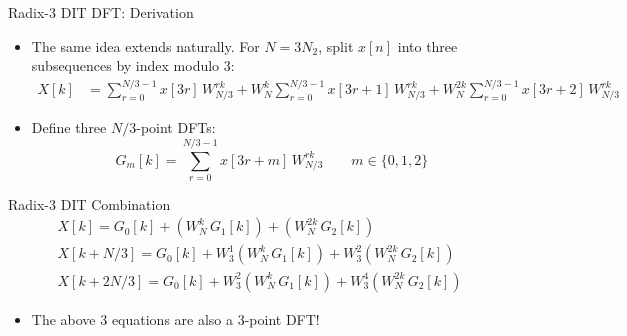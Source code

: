 \begin{frame}{Radix-3 DIT DFT: Derivation}
    \begin{itemize}
        \item The same idea extends naturally. For $N = 3 N_2$, split $x[n]$ into three subsequences by index modulo 3:
              \begin{align*}
                  X[k] & = \sum_{r=0}^{N/3-1} x[3r]\, W_{N/3}^{rk} + W_N^k \sum_{r=0}^{N/3-1} x[3r+1]\, W_{N/3}^{rk} + W_N^{2k} \sum_{r=0}^{N/3-1} x[3r+2]\, W_{N/3}^{rk}
              \end{align*}
        \item Define three $N/3$-point DFTs:
              \begin{equation*}
                  G_m[k] = \sum_{r=0}^{N/3-1} x[3r+m]\, W_{N/3}^{rk} \qquad m \in \{0, 1, 2\}
              \end{equation*}
    \end{itemize}
    \begin{conceptbox}{Radix-3 DIT Combination}
        \begin{align*}
            X[k] = G_0[k] + (W_N^{k}\, G_1[k]) + (W_N^{2k}\, G_2[k])                   \\
            X[k+N/3] = G_0[k] + W_3^{1}(W_N^{k}\, G_1[k]) + W_3^{2}(W_N^{2k}\, G_2[k]) \\
            X[k+2N/3] = G_0[k] + W_3^{2}(W_N^{k}\, G_1[k]) + W_3^{4}(W_N^{2k}\, G_2[k])
        \end{align*}
    \end{conceptbox}
    \begin{itemize}
        \item The above 3 equations are also a 3-point DFT!
    \end{itemize}
\end{frame}

